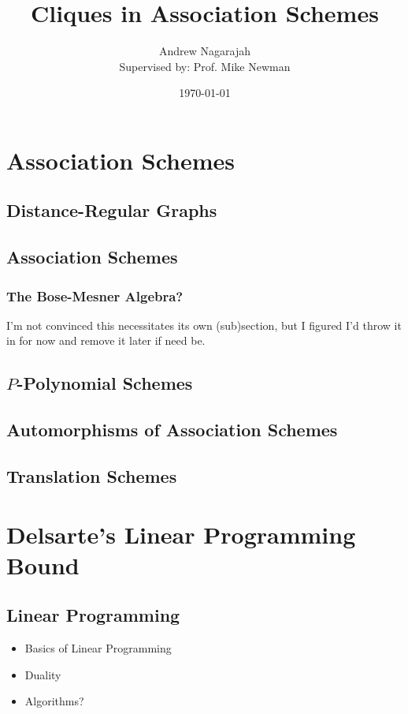 \documentclass{report}
\title{Cliques in Association Schemes}
\author{
  Andrew Nagarajah \\
  Supervised by: Prof. Mike Newman
}
\date{\today}
\begin{document}
\maketitle

\tableofcontents

\chapter{Association Schemes}
  \section{Distance-Regular Graphs}

  \section{Association Schemes}
    \subsection{The Bose-Mesner Algebra?}
      I'm not convinced this necessitates its own (sub)section, but I figured I'd
      throw it in for now and remove it later if need be.

  \section{$P$-Polynomial Schemes}

  \section{Automorphisms of Association Schemes}

  \section{Translation Schemes}

\chapter{Delsarte's Linear Programming Bound}
  \section{Linear Programming}
    \begin{itemize}
      \item Basics of Linear Programming
      \item Duality
      \item Algorithms?
    \end{itemize}
\end{document}
